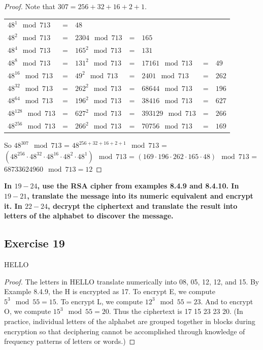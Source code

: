\documentclass[14pt]{extarticle}
\newcommand{\cy}{\color{cyan}}
\begin{document}
\begin{proof}
Note that \(307 = 256 + 32 + 16 + 2 + 1\).

\begin{tabular}{lclclcl}
\(48^1 \mod 713\) & = & \(48\) \\
\(48^2 \mod 713\) & = & \(2304 \mod 713\) & = & \(165\)\\
\(48^4 \mod 713\) & = & \(165^2 \mod 713\) & = & \(131\) \\
\(48^8 \mod 713\) & = & \(131^2 \mod 713\) & = & \(17161 \mod 713\) & = & \(49\) \\
\(48^{16} \mod 713\) & = & \(49^2 \mod 713\) & = & \(2401 \mod 713\) & = & \(262\) \\
\(48^{32} \mod 713\) & = & \(262^2 \mod 713\) & = & \(68644 \mod 713\) & = & \(196\) \\
\(48^{64} \mod 713\) & = & \(196^2 \mod 713\) & = & \(38416 \mod 713\) & = & \(627\) \\
\(48^{128} \mod 713\) & = & \(627^2 \mod 713\) & = & \(393129 \mod 713\) & = & \(266\) \\
\(48^{256} \mod 713\) & = & \(266^2 \mod 713\) & = & \(70756 \mod 713\) & = & \(169\)
\end{tabular}

So \(48^{307} \mod 713\) = \(48^{256 + 32 + 16 + 2 + 1} \mod 713\) = \((48^{256} \cdot 48^{32} \cdot 48^{16} 
\cdot 48^{2} \cdot 48^{1}) \mod 713\) = \((169 \cdot 196 \cdot 262 \cdot 165 \cdot 48) \mod 713\) = \(68733624960 
\mod 713 = 12\)
\end{proof}

{\bf \cy In $19-24$, use the RSA cipher from examples 8.4.9 and 8.4.10. In $19-21$, translate the message into its 
numeric equivalent and encrypt it. In $22-24$, decrypt the ciphertext and translate the result into letters of the 
alphabet to discover the message.}

\subsection{Exercise 19}
HELLO

\begin{proof}
The letters in HELLO translate numerically into 08, 05, 12, 12, and 15. By Example 8.4.9, the H is encrypted as 17. To 
encrypt E, we compute \(5^3 \mod 55 = 15\). To encrypt L, we compute \(12^3 \mod 55 = 23\). And to encrypt O, we 
compute \(15^3 \mod 55 = 20\). Thus the ciphertext is 17 15 23 23 20. (In practice, individual letters of the alphabet 
are grouped together in blocks during encryption so that deciphering cannot be accomplished through knowledge of 
frequency patterns of letters or words.)
\end{proof}
\end{document}
